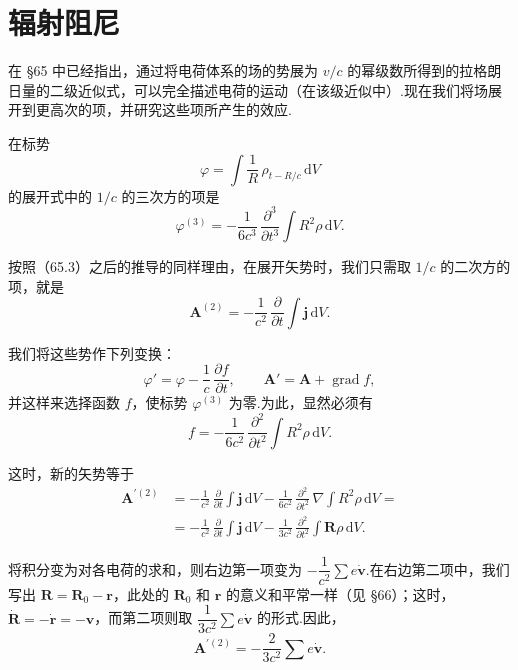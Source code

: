 \section{辐射阻尼}

在 §65 中已经指出，通过将电荷体系的场的势展为 $v/c$ 的幂级数所得到的拉格朗日量的二级近似式，可以完全描述电荷的运动（在该级近似中）.现在我们将场展开到更高次的项，并研究这些项所产生的效应.

在标势
\begin{equation*}
  \varphi=\int\frac{1}{R}\,\rho_{t-R/c}\,\mathrm{d}V
\end{equation*}
的展开式中的 $1/c$ 的三次方的项是
\begin{equation}
  \varphi^{(3)}=-\frac{1}{6c^3}\,\frac{\partial^3}{\partial t^3}\int R^2\rho\,\mathrm{d}V.
\end{equation}

按照（65.3）之后的推导的同样理由，在展开矢势时，我们只需取 $1/c$ 的二次方的项，就是
\begin{equation}
  \boldsymbol{A}^{(2)}=-\frac{1}{c^2}\,\frac{\partial}{\partial t}\int\boldsymbol{j}\,\mathrm{d}V.
\end{equation}

我们将这些势作下列变换：
\begin{equation*}
  \varphi'=\varphi-\frac{1}{c}\,\frac{\partial f}{\partial t},\qquad
  \boldsymbol{A}'=\boldsymbol{A}+\operatorname{grad}f,
\end{equation*}
并这样来选择函数 $f$，使标势 $\varphi^{(3)}$ 为零.为此，显然必须有
\begin{equation*}
  f=-\frac{1}{6c^2}\,\frac{\partial^2}{\partial t^2}\int R^2\rho\,\mathrm{d}V.
\end{equation*}

这时，新的矢势等于
\begin{equation*}
\begin{aligned}
  \boldsymbol{A}^{\prime(2)}
  &=-\frac{1}{c^2}\,\frac{\partial}{\partial t}\int\boldsymbol{j}\,\mathrm{d}V
  -\frac{1}{6c^2}\,\frac{\partial^2}{\partial t^2}\,\nabla\int R^2\rho\,\mathrm{d}V=\\
  &=-\frac{1}{c^2}\,\frac{\partial}{\partial t}\int\boldsymbol{j}\,\mathrm{d}V
  -\frac{1}{3c^2}\,\frac{\partial^2}{\partial t^2}\int\boldsymbol{R}\rho\,\mathrm{d}V.
\end{aligned}
\end{equation*}

将积分变为对各电荷的求和，则右边第一项变为 $-\dfrac{1}{c^2}\sum e\dot{\boldsymbol{v}}$.在右边第二项中，我们写出 $\boldsymbol{R}=\boldsymbol{R}_0-\boldsymbol{r}$，此处的 $\boldsymbol{R}_0$ 和 $\boldsymbol{r}$ 的意义和平常一样（见 §66）；这时，$\dot{\boldsymbol{R}}=-\dot{\boldsymbol{r}}=-\boldsymbol{v}$，而第二项则取 $\dfrac{1}{3c^2}\sum e\dot{\boldsymbol{v}}$ 的形式.因此，
\begin{equation}
  \boldsymbol{A}^{\prime(2)}=-\frac{2}{3c^2}\sum e\dot{\boldsymbol{v}}.
\end{equation}

